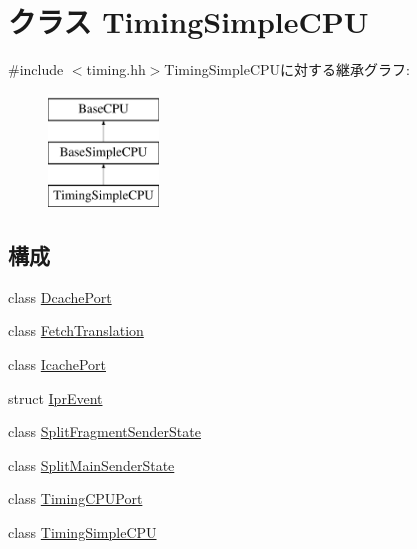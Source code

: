 \hypertarget{classTimingSimpleCPU}{
\section{クラス TimingSimpleCPU}
\label{classTimingSimpleCPU}
}


{\ttfamily \#include $<$timing.hh$>$}TimingSimpleCPUに対する継承グラフ:\begin{figure}[H]
\begin{center}
\leavevmode
\includegraphics[height=3cm]{classTimingSimpleCPU}
\end{center}
\end{figure}
\subsection*{構成}
\begin{DoxyCompactItemize}
\item 
class \hyperlink{classTimingSimpleCPU_1_1DcachePort}{DcachePort}
\item 
class \hyperlink{classTimingSimpleCPU_1_1FetchTranslation}{FetchTranslation}
\item 
class \hyperlink{classTimingSimpleCPU_1_1IcachePort}{IcachePort}
\item 
struct \hyperlink{structTimingSimpleCPU_1_1IprEvent}{IprEvent}
\item 
class \hyperlink{classTimingSimpleCPU_1_1SplitFragmentSenderState}{SplitFragmentSenderState}
\item 
class \hyperlink{classTimingSimpleCPU_1_1SplitMainSenderState}{SplitMainSenderState}
\item 
class \hyperlink{classTimingSimpleCPU_1_1TimingCPUPort}{TimingCPUPort}
\item 
class \hyperlink{classTimingSimpleCPU_1_1TimingSimpleCPU}{TimingSimpleCPU}
\end{DoxyCompactItemize}
